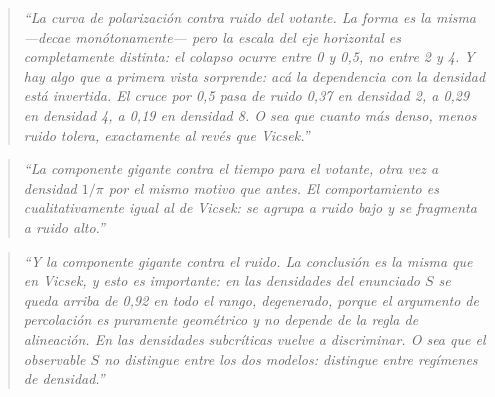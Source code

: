 \documentclass[11pt]{article}
\begin{document}

\begin{quote}
\itshape
``La curva de polarización contra ruido del votante. La forma es la misma
---decae monótonamente--- pero la escala del eje horizontal es completamente
distinta: el colapso ocurre entre 0 y 0,5, no entre 2 y 4. Y hay algo que a
primera vista sorprende: acá la dependencia con la densidad está
\emph{invertida}. El cruce por 0,5 pasa de ruido 0,37 en densidad 2, a 0,29 en
densidad 4, a 0,19 en densidad 8. O sea que cuanto más denso, \emph{menos} ruido
tolera, exactamente al revés que Vicsek.''
\end{quote}



\begin{quote}
\itshape
``La componente gigante contra el tiempo para el votante, otra vez a densidad
$1/\pi$ por el mismo motivo que antes. El comportamiento es cualitativamente
igual al de Vicsek: se agrupa a ruido bajo y se fragmenta a ruido alto.''
\end{quote}


\begin{quote}
\itshape
``Y la componente gigante contra el ruido. La conclusión es la misma que en
Vicsek, y esto es importante: en las densidades del enunciado $S$ se queda
arriba de 0,92 en todo el rango, degenerado, porque el argumento de percolación
es puramente geométrico y no depende de la regla de alineación. En las
densidades subcríticas vuelve a discriminar. O sea que el observable $S$ no
distingue entre los dos modelos: distingue entre regímenes de densidad.''
\end{quote}

\end{document}
